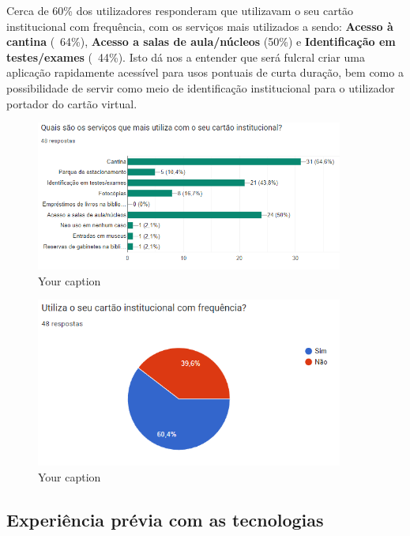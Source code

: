 \documentclass{article}
\begin{document}
Cerca de 60\% dos utilizadores responderam que utilizavam o seu cartão institucional com frequência, com os serviços mais utilizados a sendo: \textbf{Acesso à cantina} (~64\%), \textbf{Acesso a salas de aula/núcleos} (50\%) e \textbf{Identificação em testes/exames} (~44\%).
Isto dá nos a entender que será fulcral criar uma aplicação rapidamente acessível para usos pontuais de curta duração, bem como a possibilidade de servir como meio de identificação institucional para o utilizador portador do cartão virtual.

\begin{figure}[h]
    \centering
    \includegraphics[width=0.9\textwidth]{images/questionaire2.png}
    \caption{Your caption}
\end{figure}

\begin{figure}[h]
    \centering
    \includegraphics[width=0.9\textwidth]{images/questionaire3.png}
    \caption{Your caption}
\end{figure}

\subsection{Experiência prévia com as tecnologias}
\end{document}
